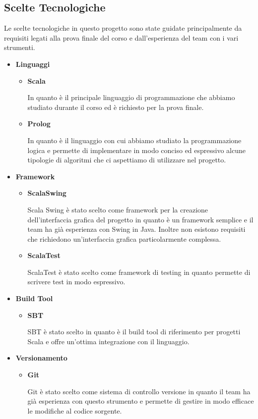 \subsection{Scelte Tecnologiche}
Le scelte tecnologiche in questo progetto sono state guidate
principalmente da requisiti legati alla prova finale del corso e
dall'esperienza del team con i vari strumenti.
\begin{itemize}
    \item \textbf{Linguaggi}\par
    \begin{itemize}
        \item \textbf{Scala}\par
        In quanto è il principale linguaggio di programmazione che abbiamo 
        studiato durante il corso ed è richiesto per la prova finale.
        \item \textbf{Prolog}\par
        In quanto è il linguaggio con cui abbiamo studiato la programmazione
        logica e permette di implementare in modo conciso ed espressivo
        alcune tipologie di algoritmi che ci aspettiamo di utilizzare
        nel progetto.
    \end{itemize}
    \item \textbf{Framework}\par
    \begin{itemize}
        \item \textbf{ScalaSwing}\par
        Scala Swing è stato scelto come framework per la creazione
        dell'interfaccia grafica del progetto in quanto è un framework
        semplice e il team ha già esperienza con Swing in Java. Inoltre 
        non esistono requisiti che richiedono un'interfaccia grafica
        particolarmente complessa.
        \item \textbf{ScalaTest}\par
        ScalaTest è stato scelto come framework di testing in quanto
        permette di scrivere test in modo espressivo.
    \end{itemize}
    \item \textbf{Build Tool}\par
    \begin{itemize}
        \item \textbf{SBT}\par
        SBT è stato scelto in quanto è il build tool di
        riferimento per progetti Scala e offre un'ottima integrazione
        con il linguaggio.
    \end{itemize}\par
    \item \textbf{Versionamento}\par
    \begin{itemize}
        \item \textbf{Git}\par
        Git è stato scelto come sistema di controllo versione in quanto
        il team ha già esperienza con questo strumento e permette 
        di gestire in modo efficace le modifiche al codice sorgente.


\end{itemize}
\end{itemize}
